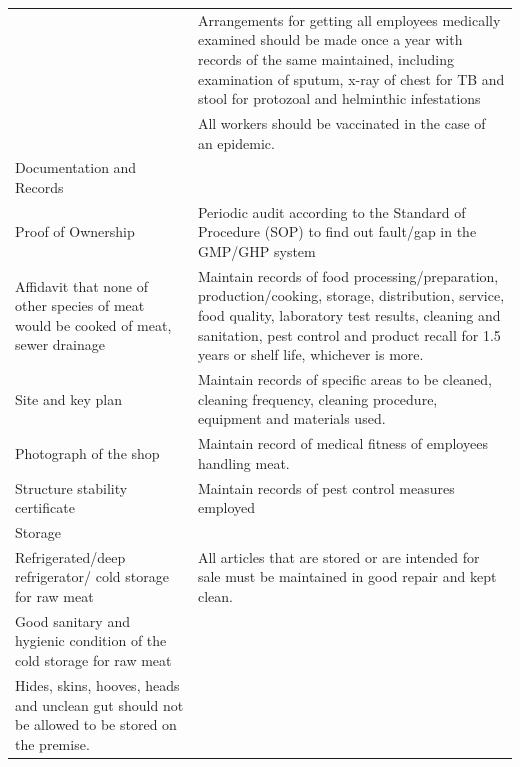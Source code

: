 \documentclass[a4paper, 12pt]{article}
\newcommand\tabitem{\makebox[1em][r]{\textbullet~}}
\begin{document}
\begin{longtable}{>{\raggedright}p{6.5cm}>{\raggedright\arraybackslash}p{8.5cm}}
	&	\newline{}\tabitem Arrangements for getting all employees medically examined should be made once a year with records of the same maintained, including examination of sputum, x-ray of chest for TB and stool for protozoal and helminthic infestations\\
	&	\newline{}\tabitem All workers should be vaccinated in the case of an epidemic. \\
\midrule
    Documentation and Records	&	\\
    \midrule
    \tabitem Proof of Ownership	&	\tabitem Periodic audit according to the Standard of Procedure (SOP) to find out fault/gap in the GMP/GHP system\\
\newline{}\tabitem Affidavit that none of other species of meat would be cooked of meat, sewer drainage	&	\newline{}\tabitem Maintain records of food processing/preparation, production/cooking, storage, distribution, service, food quality, laboratory test results, cleaning and sanitation, pest control and product recall for 1.5 years or shelf life, whichever is more.\\
\newline{}\tabitem Site and key plan	&	\newline{}\tabitem Maintain records of specific areas to be cleaned, cleaning frequency, cleaning procedure, equipment and materials used.\\
\newline{}\tabitem Photograph of the shop	&	\newline{}\tabitem Maintain record of medical fitness of employees handling meat.\\
\newline{}\tabitem Structure stability certificate	&	\newline{}\tabitem Maintain records of pest control measures employed \\
    \midrule
    Storage	&	\\
    \midrule
    \tabitem Refrigerated/deep refrigerator/ cold storage for raw meat	&   \tabitem All articles that are stored or are intended for sale must be maintained in good repair and kept clean.\\
	\newline{}\tabitem Good sanitary and hygienic condition of the cold storage for raw meat 	&	\\	\newline{}\tabitem Hides, skins, hooves, heads and unclean gut should not be allowed to be stored on the premise.\\

\end{longtable}
\end{document}
